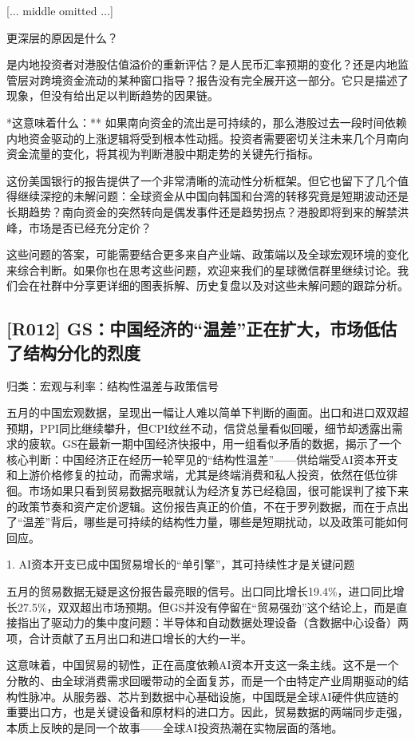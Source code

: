 \documentclass[11pt]{ctexart}
\begin{document}
[... middle omitted ...]

更深层的原因是什么？

是内地投资者对港股估值溢价的重新评估？是人民币汇率预期的变化？还是内地监管层对跨境资金流动的某种窗口指导？报告没有完全展开这一部分。它只是描述了现象，但没有给出足以判断趋势的因果链。

*这意味着什么：** 如果南向资金的流出是可持续的，那么港股过去一段时间依赖内地资金驱动的上涨逻辑将受到根本性动摇。投资者需要密切关注未来几个月南向资金流量的变化，将其视为判断港股中期走势的关键先行指标。

这份美国银行的报告提供了一个非常清晰的流动性分析框架。但它也留下了几个值得继续深挖的未解问题：全球资金从中国向韩国和台湾的转移究竟是短期波动还是长期趋势？南向资金的突然转向是偶发事件还是趋势拐点？港股即将到来的解禁洪峰，市场是否已经充分定价？

这些问题的答案，可能需要结合更多来自产业端、政策端以及全球宏观环境的变化来综合判断。如果你也在思考这些问题，欢迎来我们的星球微信群里继续讨论。我们会在社群中分享更详细的图表拆解、历史复盘以及对这些未解问题的跟踪分析。

\subsection{[R012] GS：中国经济的“温差”正在扩大，市场低估了结构分化的烈度}
{\small\color{refgray}归类：宏观与利率：结构性温差与政策信号}

五月的中国宏观数据，呈现出一幅让人难以简单下判断的画面。出口和进口双双超预期，PPI同比继续攀升，但CPI纹丝不动，信贷总量看似回暖，细节却透露出需求的疲软。GS在最新一期中国经济快报中，用一组看似矛盾的数据，揭示了一个核心判断：中国经济正在经历一轮罕见的“结构性温差”——供给端受AI资本开支和上游价格修复的拉动，而需求端，尤其是终端消费和私人投资，依然在低位徘徊。市场如果只看到贸易数据亮眼就认为经济复苏已经稳固，很可能误判了接下来的政策节奏和资产定价逻辑。这份报告真正的价值，不在于罗列数据，而在于点出了“温差”背后，哪些是可持续的结构性力量，哪些是短期扰动，以及政策可能如何回应。

1. AI资本开支已成中国贸易增长的“单引擎”，其可持续性才是关键问题

五月的贸易数据无疑是这份报告最亮眼的信号。出口同比增长19.4\%，进口同比增长27.5\%，双双超出市场预期。但GS并没有停留在“贸易强劲”这个结论上，而是直接指出了驱动力的集中度问题：半导体和自动数据处理设备（含数据中心设备）两项，合计贡献了五月出口和进口增长的大约一半。

这意味着，中国贸易的韧性，正在高度依赖AI资本开支这一条主线。这不是一个分散的、由全球消费需求回暖带动的全面复苏，而是一个由特定产业周期驱动的结构性脉冲。从服务器、芯片到数据中心基础设施，中国既是全球AI硬件供应链的重要出口方，也是关键设备和原材料的进口方。因此，贸易数据的两端同步走强，本质上反映的是同一个故事——全球AI投资热潮在实物层面的落地。
\end{document}
